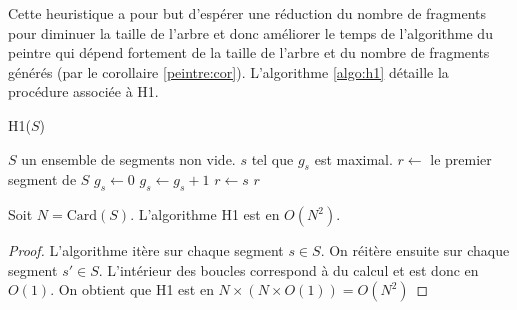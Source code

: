 Cette heuristique a pour but d'espérer une réduction du nombre de fragments
pour diminuer la taille de l'arbre
et donc améliorer le temps de l'algorithme du peintre qui dépend
fortement de la taille de l'arbre et du nombre de fragments générés (par
le corollaire \ref{peintre:cor}). L'algorithme \ref{algo:h1} détaille
la procédure associée à H1.

\begin{algorithm}
  \caption{H1($S$)}
  \begin{algorithmic}[1] \label{algo:h1}
    \REQUIRE $S$ un ensemble de segments non vide.
    \ENSURE $s$ tel que $g_s$ est maximal.
    \STATE$r\leftarrow$ le premier segment de $S$
    \STATE $g_s\leftarrow 0$
    \ENDFOR
    \STATE $g_s\leftarrow g_s +1$
    \ENDIF
    \ENDFOR
    \STATE $r\leftarrow s$
    \ENDIF
    \ENDFOR
    \RETURN $r$
  \end{algorithmic}
\end{algorithm}

\begin{prop}
  Soit $N = \mathrm{Card}(S)$. L'algorithme H1 est en $O(N^2)$.
\end{prop}
\begin{proof}
  L'algorithme itère sur chaque segment $s \in S$.
  On réitère ensuite sur chaque segment $s' \in S$.
  L'intérieur des boucles correspond à du calcul et
  est donc en $O(1)$. On obtient que H1 est en $N\times(N\times{}O(1)) = O(N^2)$
\end{proof}



